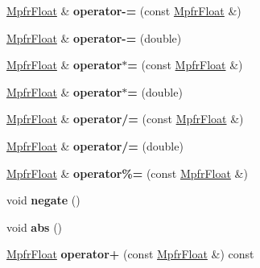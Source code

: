 \begin{DoxyCompactItemize}
\item 
\mbox{\label{class_mpfr_float_a072f11c88026d53b5fa53faff0d849f9}} 
\hyperlink{class_mpfr_float}{Mpfr\+Float} \& {\bfseries operator-\/=} (const \hyperlink{class_mpfr_float}{Mpfr\+Float} \&)
\item 
\mbox{\label{class_mpfr_float_a9b0efba241d3f7af25cbb7365ecbfc87}} 
\hyperlink{class_mpfr_float}{Mpfr\+Float} \& {\bfseries operator-\/=} (double)
\item 
\mbox{\label{class_mpfr_float_ad6afb8389c721fc8ad5d195771d8fd7b}} 
\hyperlink{class_mpfr_float}{Mpfr\+Float} \& {\bfseries operator$\ast$=} (const \hyperlink{class_mpfr_float}{Mpfr\+Float} \&)
\item 
\mbox{\label{class_mpfr_float_a81830b08051f8d6079eb8979bdd3c42a}} 
\hyperlink{class_mpfr_float}{Mpfr\+Float} \& {\bfseries operator$\ast$=} (double)
\item 
\mbox{\label{class_mpfr_float_a08e1a05770675d8b0bcbe294e86d2dff}} 
\hyperlink{class_mpfr_float}{Mpfr\+Float} \& {\bfseries operator/=} (const \hyperlink{class_mpfr_float}{Mpfr\+Float} \&)
\item 
\mbox{\label{class_mpfr_float_a3281514648b7f4acd5e8039050847c60}} 
\hyperlink{class_mpfr_float}{Mpfr\+Float} \& {\bfseries operator/=} (double)
\item 
\mbox{\label{class_mpfr_float_a18c5cd73c8f6d2cfd83fc8b6a53ba330}} 
\hyperlink{class_mpfr_float}{Mpfr\+Float} \& {\bfseries operator\%=} (const \hyperlink{class_mpfr_float}{Mpfr\+Float} \&)
\item 
\mbox{\label{class_mpfr_float_ae638938f0bc54f16891b8c85f91e086e}} 
void {\bfseries negate} ()
\item 
\mbox{\label{class_mpfr_float_a996958ab4054605eed85abafee8ece2d}} 
void {\bfseries abs} ()
\item 
\mbox{\label{class_mpfr_float_a63225dcc79a58f1e37ac3d4c63831a4e}} 
\hyperlink{class_mpfr_float}{Mpfr\+Float} {\bfseries operator+} (const \hyperlink{class_mpfr_float}{Mpfr\+Float} \&) const

\end{DoxyCompactItemize}
